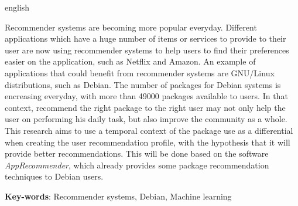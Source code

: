 \begin{resumo}[Abstract]
 \begin{otherlanguage*}{english}

   Recommender systems are becoming more popular everyday. Different
   applications which have a huge number of items or services to provide
   to their user are now using recommender systems to help users
   to find their preferences easier on the application, such as Netflix and
   Amazon. An example of applications that could benefit from recommender
   systems are GNU/Linux distributions, such as Debian. The number of
   packages for Debian systems is encreasing
   everyday, with more than 49000 packages
   available to users. In that context, recommend the right package
   to the right user may not only help the user on
   performing his daily task, but also improve the community as a whole.
   This research aims to use a temporal context of the package use as a
   differential when creating the user recommendation profile, with
   the hypothesis that it will provide better recommendations. This
   will be done based on the software \textit{AppRecommender}, which
   already provides some package recommendation techniques to
   Debian users.

   \vspace{\onelineskip}
 
   \noindent 
   \textbf{Key-words}: Recommender systems, Debian, Machine learning
 \end{otherlanguage*}
\end{resumo}
